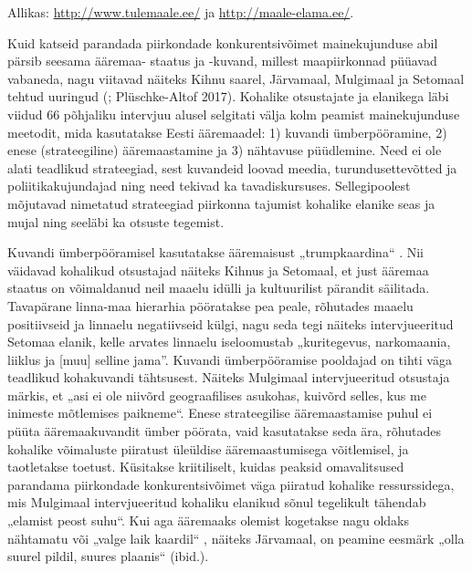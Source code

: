 \documentclass[]{book}
\begin{document}
Allikas: \url{http://www.tulemaale.ee/} ja \url{http://maale-elama.ee/}.

Kuid katseid parandada piirkondade konkurentsivõimet mainekujunduse abil pärsib seesama ääremaa-
staatus ja -kuvand, millest maapiirkonnad püüavad vabaneda, nagu viitavad näiteks Kihnu saarel, Järvamaal,
Mulgimaal ja Setomaal tehtud uuringud (\textcite{grootens2018}; Plüschke-Altof 2017). Kohalike otsustajate ja
elanikega läbi viidud 66 põhjaliku intervjuu alusel selgitati välja kolm peamist mainekujunduse meetodit,
mida kasutatakse Eesti ääremaadel: 1) kuvandi ümberpööramine, 2) enese (strateegiline) ääremaastamine ja
3) nähtavuse püüdlemine. Need ei ole alati teadlikud strateegiad, sest kuvandeid loovad meedia,
turundusettevõtted ja poliitikakujundajad ning need tekivad ka tavadiskursuses. Sellegipoolest mõjutavad
nimetatud strateegiad piirkonna tajumist kohalike elanike seas ja mujal ning seeläbi ka otsuste tegemist.

Kuvandi ümberpööramisel kasutatakse ääremaisust „trumpkaardina`` \autocite{grootens2018}. Nii väidavad
kohalikud otsustajad näiteks Kihnus ja Setomaal, et just ääremaa staatus on võimaldanud neil maaelu idülli
ja kultuurilist pärandit säilitada. Tavapärane linna-maa hierarhia pööratakse pea peale, rõhutades maaelu
positiivseid ja linnaelu negatiivseid külgi, nagu seda tegi näiteks intervjueeritud Setomaa elanik, kelle arvates linnaelu iseloomustab „kuritegevus, narkomaania, liiklus ja {[}muu{]} selline jama''. Kuvandi ümberpööramise pooldajad on tihti väga teadlikud kohakuvandi tähtsusest. Näiteks Mulgimaal intervjueeritud otsustaja märkis, et „asi ei ole niivõrd geograafilises asukohas, kuivõrd selles, kus me inimeste mõtlemises paikneme``. Enese strateegilise ääremaastamise puhul ei püüta ääremaakuvandit ümber pöörata, vaid kasutatakse seda ära, rõhutades kohalike võimaluste piiratust üleüldise ääremaastumisega võitlemisel, ja taotletakse toetust. Küsitakse kriitiliselt, kuidas peaksid omavalitsused parandama piirkondade konkurentsivõimet väga piiratud kohalike ressurssidega, mis Mulgimaal intervjueeritud kohaliku elanikud sõnul tegelikult tähendab „elamist peost suhu``. Kui aga ääremaaks olemist kogetakse nagu oldaks nähtamatu või „valge laik kaardil`` \autocite{grootens2018}, näiteks Järvamaal, on peamine eesmärk „olla suurel pildil, suures plaanis`` (ibid.).
\end{document}
